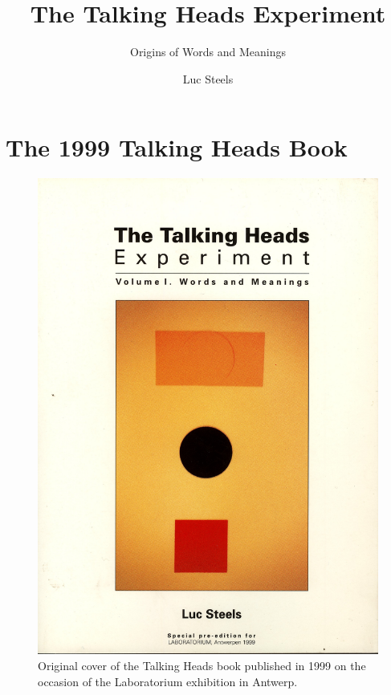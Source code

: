 \documentclass[ number=1
			   ,series=cmle
			   ,url=http://langsci-press.org/ 
			   ,isbn=978-3-944675-42-8
			   ,output=short   %
			   ,smallfont
			   ,biblatex
			   ,draftmode  
			   ,draft
			  ]{LSP/langsci}
\title{The Talking Heads Experiment}
\subtitle{Origins of Words and Meanings}
\author{Luc Steels}
\begin{document}
 


\maketitle                
\frontmatter

\tableofcontents    

\mainmatter 

\part{The 1999 Talking Heads Book}

\begin{figure}[htbp]
  \centerline{\includegraphics[width=1.0\textwidth]{extra/figs/cover-original-book}}
\caption{\small\label{left-right} Original cover of the Talking Heads book published in 1999 on the occasion of the 
Laboratorium exhibition in Antwerp.}
\label{f:cover}
\end{figure}







\end{document}
